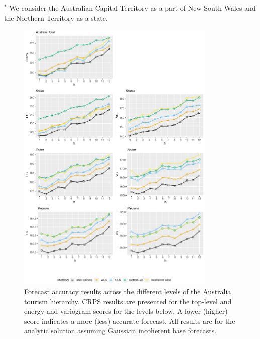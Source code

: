 \documentclass[12pt]{article}
\theoremstyle{definition}
\begin{document}
\begin{table}[!hb]
{\begin{tabular}{lllllllllll}
			\bottomrule
		\end{tabular}
	}
\fontsize{8}{9}\selectfont
$^*$ We consider the Australian Capital Territory as a part of New South Wales and the Northern Territory as a state.
\end{table}


\clearpage
\begin{figure}
	\centering
	\small
	\includegraphics[width= 0.85\textwidth, height= 0.85\textheight]{Empirical-results/Results-ARIMA/RawScore_Gauss_Levels.pdf}
	\caption{Forecast accuracy results across the different levels of the Australia tourism hierarchy. CRPS results are presented for the top-level and energy and variogram scores for the levels below. A lower (higher) score indicates a more (less) accurate forecast. All results are for the analytic solution assuming Gaussian incoherent base forecasts.} \label{fig:ES-Levels}
\end{figure}





\end{document}
